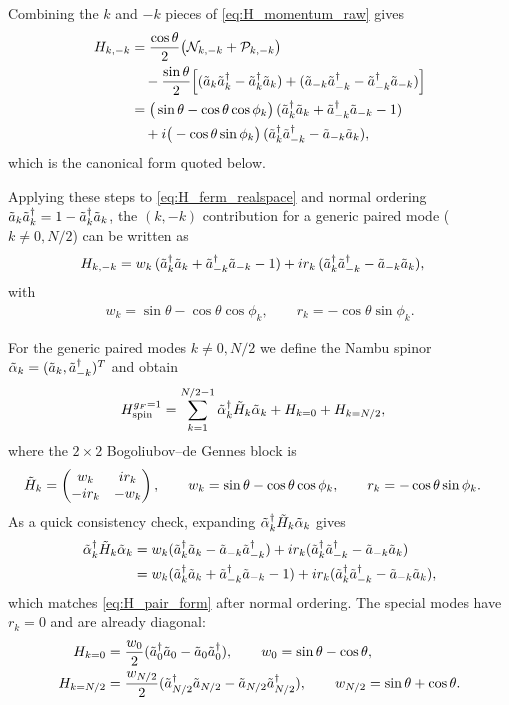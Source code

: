 \documentclass[aps,prx,twocolumn,superscriptaddress,nofootinbib,nolongbibliography,nobalancelastpage,10pt,floatfix]{revtex4-2}
\begin{document}
Combining the $k$ and $-k$ pieces of \cref{eq:H_momentum_raw} gives
\begin{align}
    H_{k,-k}
    &= \frac{\cos\theta}{2}\big(\mathcal{N}_{k,-k}+\mathcal{P}_{k,-k}\big)\nonumber\\
    &\quad
       -\frac{\sin\theta}{2}\Big[(\tilde{a}_k\tilde{a}_k^\dag-\tilde{a}_k^\dag\tilde{a}_k)
       +(\tilde{a}_{-k}\tilde{a}_{-k}^\dag-\tilde{a}_{-k}^\dag\tilde{a}_{-k})\Big]\nonumber\\
    &= \big(\sin\theta-\cos\theta\cos\phi_k\big)\,(\tilde{a}_k^\dag\tilde{a}_k+\tilde{a}_{-k}^\dag\tilde{a}_{-k}-1)\nonumber\\
    &\quad
       + i\big(-\cos\theta\sin\phi_k\big)\,(\tilde{a}_k^\dag\tilde{a}_{-k}^\dag-\tilde{a}_{-k}\tilde{a}_k),
\end{align}
which is the canonical form quoted below.

Applying these steps to \cref{eq:H_ferm_realspace} and normal ordering $\tilde{a}_k\tilde{a}_k^\dag=1-\tilde{a}_k^\dag\tilde{a}_k$, the $(k,-k)$ contribution for a generic paired mode ($k\neq 0,N/2$) can be written as
\begin{align}
    H_{k,-k}
    &= w_k\,(\tilde{a}_k^\dag\tilde{a}_k+\tilde{a}_{-k}^\dag\tilde{a}_{-k}-1)
       + i r_k\,(\tilde{a}_k^\dag\tilde{a}_{-k}^\dag-\tilde{a}_{-k}\tilde{a}_k),
    \label{eq:H_pair_form}
\end{align}
with
\begin{align}
    w_k = \sin\theta - \cos\theta\cos\phi_k,\qquad
    r_k = -\cos\theta\sin\phi_k.
\end{align}

For the generic paired modes $k\neq 0, N/2$ we define the Nambu spinor
$\tilde{\alpha}_k=(\tilde{a}_k,\tilde{a}_{-k}^\dag)^T$ and obtain
\begin{align}
    H_{\mathrm{spin}}^{g_F=1}
    &= \sum_{k=1}^{N/2-1} \tilde{\alpha}_k^\dag \tilde{H}_k \tilde{\alpha}_k + H_{k=0} + H_{k=N/2},
\end{align}
where the $2\times 2$ Bogoliubov--de Gennes block is
\begin{align}
    \tilde{H}_k &=
    \begin{pmatrix}
        w_k   & i r_k\\
        -i r_k& -w_k
    \end{pmatrix},
    \qquad
    w_k = \sin\theta - \cos\theta\cos\phi_k,\qquad
    r_k = -\cos\theta\sin\phi_k.
    \label{eq:bdg_block}
\end{align}
As a quick consistency check, expanding $\tilde{\alpha}_k^\dag\tilde{H}_k\tilde{\alpha}_k$ gives
\begin{align}
    \tilde{\alpha}_k^\dag \tilde{H}_k \tilde{\alpha}_k
    &= w_k(\tilde{a}_k^\dag\tilde{a}_k-\tilde{a}_{-k}\tilde{a}_{-k}^\dag)
       + i r_k(\tilde{a}_k^\dag\tilde{a}_{-k}^\dag-\tilde{a}_{-k}\tilde{a}_k)\nonumber\\
    &= w_k(\tilde{a}_k^\dag\tilde{a}_k+\tilde{a}_{-k}^\dag\tilde{a}_{-k}-1)
       + i r_k(\tilde{a}_k^\dag\tilde{a}_{-k}^\dag-\tilde{a}_{-k}\tilde{a}_k),
\end{align}
which matches \cref{eq:H_pair_form} after normal ordering.
The special modes have $r_k=0$ and are already diagonal:
\begin{align}
    H_{k=0} &= \frac{w_0}{2}(\tilde{a}_0^\dag\tilde{a}_0 - \tilde{a}_0\tilde{a}_0^\dag),\qquad w_0=\sin\theta-\cos\theta,\\
    H_{k=N/2} &= \frac{w_{N/2}}{2}(\tilde{a}_{N/2}^\dag\tilde{a}_{N/2} - \tilde{a}_{N/2}\tilde{a}_{N/2}^\dag),\qquad w_{N/2}=\sin\theta+\cos\theta.
\end{align}
\end{document}
